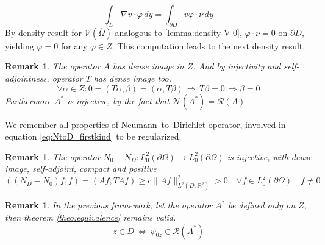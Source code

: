 \documentclass[10pt, a4paper, twoside, openright]{book}
\theoremstyle{definition}
\theoremstyle{plain}
\theoremstyle{plain}
\theoremstyle{plain}
\theoremstyle{plain}
\newtheorem{remark}[subsection]{Remark}
\theoremstyle{plain}
\theoremstyle{plain}
\theoremstyle{plain}
\theoremstyle{plain}
\let\phi\varphi
\begin{document}
\begin{equation}
 \int_D\nabla v\cdot \phi\,dy=\int_{\partial D}v \phi\cdot\nu\,dy
\end{equation}
By density result for $\mathcal{V}(\overline{\Omega})$ analogous to \ref{lemma:density-V-0}, $\phi\cdot \nu=0$ on $\partial D$, yielding $\phi=0$ for any $\phi\in Z$.
This computation leads to the next density result.
\begin{remark}
 The operator $A$ has dense image in $Z$. And by injectivity and self-adjointness, operator $T$ has dense image too.
 \begin{equation}
  \forall\alpha\in Z: 0=(T\alpha,\beta)=(\alpha,T\beta)\,\Rightarrow \, T\beta = 0 \, \Rightarrow \beta=0
 \end{equation}
 Furthermore $A^*$ is injective, by the fact that $\mathcal{N}(A^*)=\mathcal{R}(A)^\perp$
\end{remark}
We remember all properties of Neumann--to--Dirichlet operator, involved in equation \eqref{eq:NtoD_firstkind} to be regularized.
\begin{remark}
 The operator ${N_0} - {N_D}: L^2_0(\partial \Omega) \to L^2_0(\partial \Omega)$ is injective, with dense image, self-adjoint, compact and positive
 \begin{equation}
  (({N_D} - {N_0})f,f) = ( Af,TAf) \geq c\|Af\|^2_{L^2(D;\,\mathbb{R}^2)} > 0 \quad \forall f\in L^2_0(\partial \Omega) \quad f\neq0
 \end{equation} 
\end{remark}
\begin{remark}
 In the previous framework, let the operator $A^*$ be defined only on $Z$, then theorem \ref{theo:equivalence} remains valid.
  \begin{equation}
  z \in D \,\Longleftrightarrow \,\psi_{0z} \in \mathcal{R}(A^*)
 \end{equation}
\end{remark}
\end{document}
